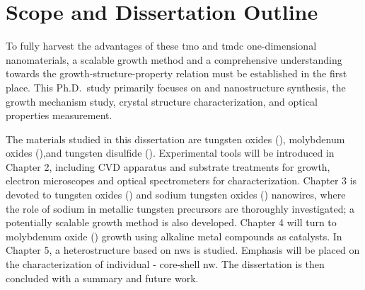\section{Scope and Dissertation Outline}
To fully harvest the advantages of these \gls{tmo} and \gls{tmdc} one-dimensional nanomaterials, a scalable growth method and a comprehensive understanding towards the growth-structure-property relation must be established in the first place. This Ph.D.\ study primarily focuses on  and  nanostructure synthesis, the growth mechanism study, crystal structure characterization, and optical properties measurement.

The materials studied in this dissertation are tungsten oxides (), molybdenum oxides (),and tungsten disulfide (). Experimental tools will be introduced in Chapter 2, including CVD apparatus and substrate treatments for growth, electron microscopes and optical spectrometers for characterization. Chapter 3 is devoted to tungsten oxides () and sodium tungsten oxides () nanowires, where the role of sodium in metallic tungsten precursors are thoroughly investigated; a potentially scalable growth method is also developed. Chapter 4 will turn to molybdenum oxide () growth using alkaline metal compounds as catalysts. In Chapter 5, a heterostructure based on  \glspl{nw} is studied. Emphasis will be placed on the characterization of individual - core-shell \gls{nw}. The dissertation is then concluded with a summary and future work. 
